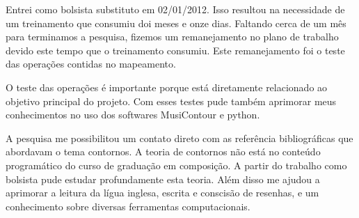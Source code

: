 \documentclass[11pt]{article}
\begin{document}

Entrei como bolsista substituto em 02/01/2012. Isso resultou na
necessidade de um treinamento que consumiu doi meses e onze dias.
Faltando cerca de um mês para terminamos a pesquisa, fizemos um
remanejamento no plano de trabalho devido este tempo que o treinamento
consumiu. Este remanejamento foi o teste das operações contidas no
mapeamento.

O teste das operações é importante porque está diretamente
relacionado ao objetivo principal do projeto.
Com esses testes pude também aprimorar meus conhecimentos no uso dos
softwares MusiContour e python.

A pesquisa me possibilitou um contato direto com as referência
bibliográficas que abordavam o tema contornos.  A teoria de contornos
não está no conteúdo programático do curso de graduação em composição.
A partir do trabalho como bolsista pude estudar profundamente esta
teoria.  Além disso me ajudou a aprimorar a leitura da lígua inglesa,
escrita e conscisão de resenhas, e um conhecimento sobre diversas
ferramentas computacionais.


\renewcommand{\refname}{Referências bibliográficas (máximo 15)}

\nocite{
  Friedmann1985,
  Friedmann1987,
  Morris1987,
  Marvin1987,
  Marvin1988,
  Polansky1992,
  Morris1993,
  Clifford1995,
  Quinn1997,
  Beard2003,
  Sampaio2008,
  Schultz2008,
  Schultz2009,
  Bor2009
}





\end{document}
